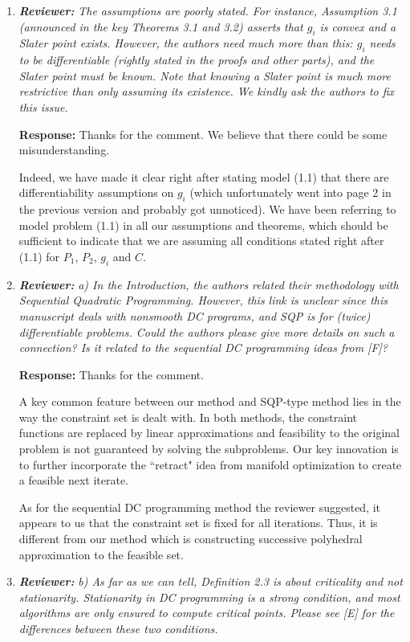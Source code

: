 \documentclass{article}
\begin{document}
\begin{enumerate}
    \item \textit{\textbf{Reviewer:}} {\it The assumptions are poorly stated. For instance, Assumption 3.1 (announced in the key Theorems 3.1 and 3.2) asserts that $g_i$ is convex and a Slater point exists. However, the authors need much more than this: $g_i$ needs to be differentiable (rightly stated in the proofs and other parts), and the Slater point must be known. Note that knowing a Slater point is much more restrictive than only assuming its existence. We kindly ask the authors to fix this issue.}

    \textbf{Response:} Thanks for the comment. We believe that there could be some misunderstanding.

    Indeed, we have made it clear right after stating model (1.1) that there are differentiability assumptions on $g_i$ (which unfortunately went into page 2 in the previous version and probably got unnoticed). We have been referring to model problem (1.1) in all our assumptions and theorems, which should be sufficient to indicate that we are assuming all conditions stated right after (1.1) for $P_1$, $P_2$, $g_i$ and $C$.

	\item \textit{\textbf{Reviewer:}} \textit{ a) In the Introduction, the authors related their methodology with Sequential Quadratic Programming. However, this link is unclear since this manuscript deals with nonsmooth DC programs, and SQP is for (twice) differentiable problems. Could the authors please give more details on such a connection? Is it related to the sequential DC programming ideas from [F]?}
	
	\textbf{Response:} Thanks for the comment.

    A key common feature between our method and SQP-type method lies in the way the constraint set is dealt with. In both methods, the constraint functions are replaced by linear approximations and feasibility to the original problem is not guaranteed by solving the subproblems. Our key innovation is to further incorporate the ``retract" idea from manifold optimization to create a feasible next iterate.

    As for the sequential DC programming method the reviewer suggested, it appears to us that the constraint set is fixed for all iterations. Thus, it is different from our method which is constructing successive polyhedral approximation to the feasible set.
	
	\item \textit{\textbf{Reviewer:}} \textit{ b) As far as we can tell, Definition 2.3 is about criticality and not stationarity. Stationarity in DC programming is a strong condition, and most algorithms are only ensured to compute critical points. Please see [E] for the differences between these two conditions.}
	

\end{enumerate}
\end{document}
